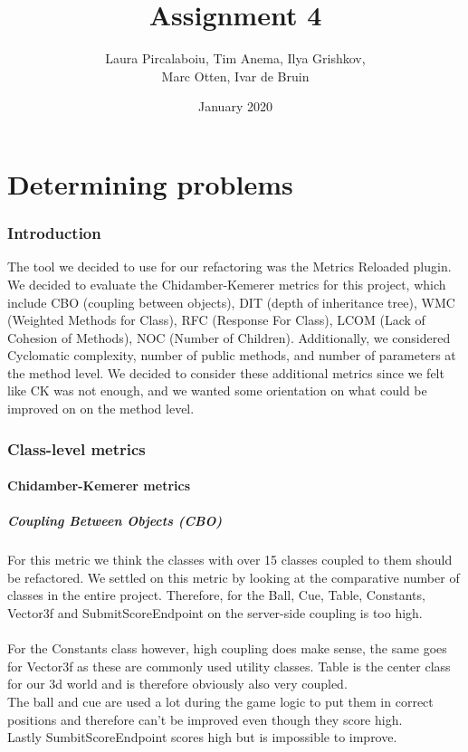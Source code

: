 \documentclass{article}
\title{Assignment 4}
\author{Laura Pircalaboiu, Tim Anema, Ilya Grishkov, \\ Marc Otten, Ivar de Bruin}
\date{January 2020}
\begin{document}
\maketitle
\part{Determining problems}
\section{Introduction}
The tool we decided to use for our refactoring was the Metrics Reloaded plugin. We decided to evaluate the Chidamber-Kemerer metrics for this project, which include CBO (coupling between objects), DIT (depth of inheritance tree), WMC (Weighted Methods for Class),  RFC (Response For Class), LCOM (Lack of Cohesion of Methods), NOC (Number of Children). Additionally, we considered Cyclomatic complexity, number of public methods, and number of parameters at the method level.
We decided to consider these additional metrics since we felt like CK was not enough, and we wanted some orientation on what could be improved on on the method level.
\section{Class-level metrics}
\subsection{Chidamber-Kemerer metrics}
\subsubsection{Coupling Between Objects (CBO)}
For this metric we think the classes with over 15 classes coupled to them should be refactored. We settled on this metric by looking at the comparative number of classes in the entire project. Therefore, for the Ball, Cue, Table, Constants, Vector3f and SubmitScoreEndpoint on the server-side coupling is too high. 
\\\\
For the Constants class however, high coupling does make sense, the same goes for Vector3f as these are commonly used utility classes.
Table is the center class for our 3d world and is therefore obviously also very coupled.
\\The ball and cue are used a lot during the game logic to put them in correct positions and therefore can't be improved even though they score high.
\\Lastly SumbitScoreEndpoint scores high but is impossible to improve.
\end{document}

